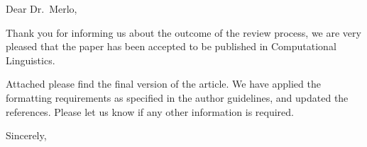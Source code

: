 \documentclass{letter}
\begin{document}
\begin{letter}{}
\opening{Dear Dr.~Merlo,}

Thank you for informing us about the outcome of the review process, we are very pleased that the paper has been accepted to be published in Computational Linguistics.

Attached please find the final version of the article. We have applied the formatting requirements as specified in the author guidelines, and updated the references. Please let us know if any other information is required. 

\closing{Sincerely,}

\end{letter}
\end{document}
